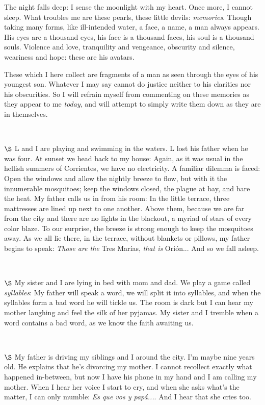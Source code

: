 \documentclass[a4paper, 12pt]{article}
\begin{document}
The night falls deep: I sense the moonlight with my heart. Once more, I cannot
sleep. What troubles me are these pearls, these little devils:
\textit{memories}. Though taking many forms, like ill-intended water, a face, a
name, a man always appears. His eyes are a thousand eyes, his face is a
thousand faces, his soul is a thousand souls. Violence and love, tranquility
and vengeance, obscurity and silence, weariness and hope: these are his
avatars. 

These which I here collect are fragments of a man as seen through the eyes of
his youngest son. Whatever I may say cannot do justice neither to his clarities
nor his obscurities. So I will refrain myself from commenting on these memories
as they appear to me \textit{today}, and will attempt to simply write them down
as they are in themselves.

~ 

$\S$ L and I are playing and swimming in the waters. L lost his father when he
was four. At sunset we head back to my house: Again, as it was usual in the
hellish summers of Corrientes, we have no electricity. A familiar dilemma is
faced: Open the windows and allow the nightly breeze to flow, but with it the
innumerable mosquitoes; keep the windows closed, the plague at bay,
and bare the heat. My father calls us in from his room: In the little terrace,
three mattresses are lined up next to one another. Above them, because we are 
far from the city and there are no lights in the blackout, a myriad of stars of every
color blaze. To our surprise, the breeze is strong enough to keep the mosquitoes 
away. As we all lie there, in the terrace, without blankets or pillows,
my father begins to speak: \textit{Those are the} Tres Marías, \textit{that is } Orión...
And so we fall asleep.

~ 


$\S$ My sister and I are lying in bed with mom and dad. We play a game called
\textit{syllables}: My father will speak a word, we will split it into
syllables, and when the syllables form a bad word he will tickle us. The room
is dark but I can hear my mother laughing and feel the silk of her pyjamas. My
sister and I tremble when a word contains a bad word, as we know the faith
awaiting us.

~ 

$\S$ My father is driving my siblings and I around the city. I'm maybe nine
years old. He explains that he's divorcing my mother. I cannot recollect
exactly what happened in-between, but now I have his phone in my hand and I am
calling my mother. When I hear her voice I start to cry, and when she asks
what's the matter, I can only mumble: \textit{Es que vos y papá...}. And I hear
that she cries too.
\end{document}
